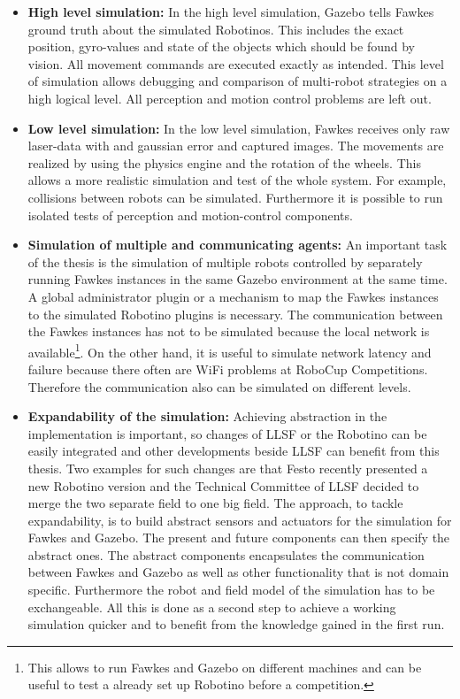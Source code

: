 \documentclass[a4paper,11pt]{article}
\begin{document}
\begin{itemize}
\item \textbf{High level simulation:} In the high level simulation, Gazebo tells Fawkes ground truth about the simulated Robotinos. This includes the exact position, gyro-values and state of the objects which should be found by vision. All movement commands are executed exactly as intended. This level of simulation allows debugging and comparison of multi-robot strategies on a high logical level. All perception and motion control problems are left out.
\item \textbf{Low level simulation:} In the low level simulation, Fawkes receives only raw laser-data with and gaussian error and captured images. The movements are realized by using the physics engine and the rotation of the wheels. This allows a more realistic simulation and test of the whole system. For example, collisions between robots can be simulated. Furthermore it is possible to run isolated tests of perception and motion-control components.
\item \textbf{Simulation of multiple and communicating agents:} An important task of the thesis is the simulation of multiple robots controlled by separately running Fawkes instances in the same Gazebo environment at the same time. A global administrator plugin or a mechanism to map the Fawkes instances to the simulated Robotino plugins is necessary. The communication between the Fawkes instances has not to be simulated because the local network is available\footnote{This allows to run Fawkes and Gazebo on different machines and can be useful to test a already set up Robotino before a competition.}. On the other hand, it is useful to simulate network latency and failure because there often are WiFi problems at RoboCup Competitions. Therefore the communication also can be simulated on different levels.\\
\item \textbf{Expandability of the simulation:} Achieving abstraction in the implementation is important, so changes of LLSF or the Robotino can be easily integrated and other developments beside LLSF can benefit from this thesis. Two examples for such changes are that Festo recently presented a new Robotino version and the Technical Committee of LLSF decided to merge the two separate field to one big field. The approach, to tackle expandability, is to build abstract sensors and actuators for the simulation for Fawkes and Gazebo. The present and future components can then specify the abstract ones. The abstract components encapsulates the communication between Fawkes and Gazebo as well as other functionality that is not domain specific. Furthermore the robot and field model of the simulation has to be exchangeable. All this is done as a second step to achieve a working simulation quicker and to benefit from the knowledge gained in the first run.

\end{itemize}
\end{document}
